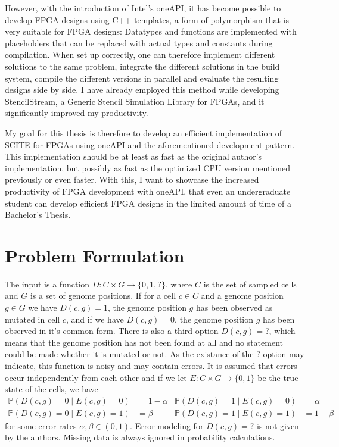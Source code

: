 However, with the introduction of Intel's oneAPI, it has become possible to develop \ac{FPGA} designs using C++ templates, a form of polymorphism that is very suitable for \ac{FPGA} designs: Datatypes and functions are implemented with placeholders that can be replaced with actual types and constants during compilation. When set up correctly, one can therefore implement different solutions to the same problem, integrate the different solutions in the build system, compile the different versions in parallel and evaluate the resulting designs side by side. I have already employed this method while developing StencilStream, a Generic Stencil Simulation Library for \acp{FPGA}, and it significantly improved my productivity.

My goal for this thesis is therefore to develop an efficient implementation of SCITE for \acp{FPGA} using oneAPI and the aforementioned development pattern. This implementation should be at least as fast as the original author's implementation, but possibly as fast as the optimized CPU version mentioned previously or even faster. With this, I want to showcase the increased productivity of \ac{FPGA} development with oneAPI, that even an undergraduate student can develop efficient FPGA designs in the limited amount of time of a Bachelor's Thesis.

\section{Problem Formulation}

The input is a function $D: C \times G \rightarrow \{0, 1, ?\}$, where $C$ is the set of sampled cells and $G$ is a set of genome positions. If for a cell $c \in C$ and a genome position $g \in G$ we have $D(c, g) = 1$, the genome position $g$ has been observed as mutated in cell $c$, and if we have $D(c, g) = 0$, the genome position $g$ has been observed in it's common form. There is also a third option $D(c, g) = ?$, which means that the genome position has not been found at all and no statement could be made whether it is mutated or not. As the existance of the $?$ option may indicate, this function is noisy and may contain errors. It is assumed that errors occur independently from each other and if we let $E: C \times G \rightarrow \{0, 1\}$ be the true state of the cells, we have
\begin{align*}
    \mathbb{P}(D(c, g) = 0 \mid E(c, g) = 0) &= 1 - \alpha & \mathbb{P}(D(c, g) = 1 \mid E(c, g) = 0) &= \alpha \\
    \mathbb{P}(D(c, g) = 0 \mid E(c, g) = 1) &= \beta & \mathbb{P}(D(c, g) = 1 \mid E(c, g) = 1) &= 1 - \beta
\end{align*}
for some error rates $\alpha, \beta \in (0, 1)$. Error modeling for $D(c, g) = ?$ is not given by the authors. Missing data is always ignored in probability calculations.


